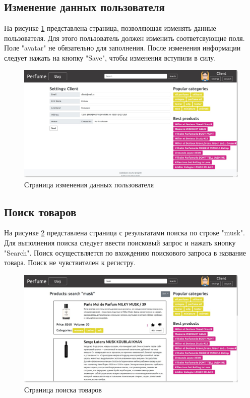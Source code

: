 \subsection{Изменение данных пользователя}

На рисунке \ref{site_settings} представлена страница, позволяющая изменять данные пользователя. Для этого пользователь должен изменить соответсвующие поля. Поле "avatar" не обязательно для заполнения. После изменения информации следует нажать на кнопку "Save", чтобы изменения вступили в силу.

\captionsetup{singlelinecheck = false, justification=centering}
\begin{figure}[h!]
	\begin{center}
		\includegraphics[scale=0.45]{assets/site_settings.jpg}
	\end{center}
	\caption{Страница изменения данных пользователя}
	\label{site_settings}
\end{figure}

\subsection{Поиск товаров}

На рисунке \ref{site_search} представлена страница с результатами поиска по строке "musk". Для выполнения поиска следует ввести поисковый запрос и нажать кнопку "Search". Поиск осуществляется по вхождению поискового запроса в название товара. Поиск не чувствителен к регистру.

\captionsetup{singlelinecheck = false, justification=centering}
\begin{figure}[h!]
	\begin{center}
		\includegraphics[scale=0.45]{assets/site_search.jpg}
	\end{center}
	\caption{Страница поиска товаров}
	\label{site_search}
\end{figure}

